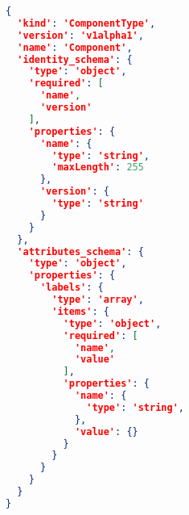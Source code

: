 \begin{lstlisting}[language=json, caption=Request Body for Component Version Schema Creation, captionpos=b, label=lst:ComponentVersionSchemaCreation]
{
  'kind': 'ComponentType',
  'version': 'v1alpha1',
  'name': 'Component',
  'identity_schema': {
    'type': 'object',
    'required': [
      'name',
      'version'
    ],
    'properties': {
      'name': {
        'type': 'string',
        'maxLength': 255
      },
      'version': {
        'type': 'string'
      }
    }
  },
  'attributes_schema': {
    'type': 'object',
    'properties': {
      'labels': {
        'type': 'array',
        'items': {
          'type': 'object',
          'required': [
            'name',
            'value'
          ],
          'properties': {
            'name': {
              'type': 'string',
            },
            'value': {}
          }
        }  
      }
    }
  }
}
\end{lstlisting}

